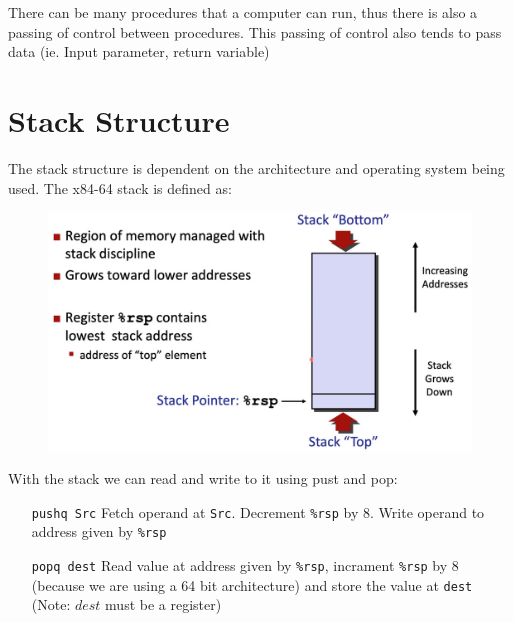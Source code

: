 \documentclass[12pt]{book}
\begin{document}
There can be many procedures that a computer can run, thus there is also a passing of control between procedures. This 
passing of control also tends to pass data (ie. Input parameter, return variable) 
\pagebreak


\section*{Stack Structure}
The stack structure is dependent on the architecture and operating system being used. The x84-64 stack is defined as:
\begin{figure}[h]
        \centering
        \includegraphics[scale = 0.4]{./figures/x86stack}
\end{figure}

With the stack we can read and write to it using pust and pop:
\begin{itemize}
        \item[\texttt{pushq Src}] Fetch operand at \texttt{Src}. Decrement \texttt{\%rsp} by 8. Write operand to 
                address given by \texttt{\%rsp}
        \item[\texttt{popq dest}] Read value at address given by \texttt{\%rsp}, 
                incrament \texttt{\%rsp} by 8 (because we are using a 64 bit architecture) and store the value at
                \texttt{dest} (Note: $dest$ must be a register)
\end{itemize}
\end{document}
